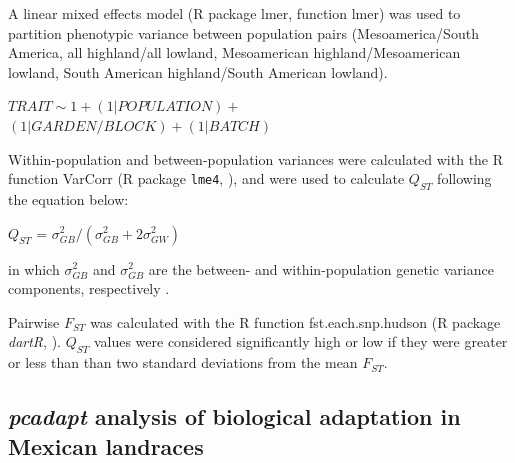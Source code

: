\documentclass[9pt,twocolumn,twoside,lineno]{BioRxiv}
\begin{document}
A linear mixed effects model (R package lmer, function lmer) was used to partition phenotypic variance between population pairs (Mesoamerica/South America, all highland/all lowland, Mesoamerican highland/Mesoamerican lowland, South American highland/South American lowland).

\begin{center}

${ TRAIT \sim 1 + (1|POPULATION) + }$\\
${(1|GARDEN/BLOCK) + (1|BATCH)}$

\end{center}

Within-population and between-population variances were calculated with the R function VarCorr (R package \texttt{lme4}, \citealp{bates2014lme4}), and were used to calculate $Q_{ST}$ following the equation below:

\begin{center}
$Q_{ST}$ = \(\sigma^{2}_{GB}/(\sigma^{2}_{GB}+2\sigma^{2}_{GW})\)
\end{center}

\noindent in which $\sigma^{2}_{GB}$ and $\sigma^{2}_{GB}$ are the between- and within-population genetic variance components, respectively \cite{Leinonen2013-ic}.

Pairwise $F_{ST}$ was calculated with the R function fst.each.snp.hudson (R package \textit{dartR}, \citealp{gruber2018dartr}).
$Q_{ST}$ values were considered significantly high or low if they were greater or less than than two standard deviations from the mean $F_{ST}$.
\subsection{\textit{pcadapt} analysis of biological adaptation in Mexican landraces}
\end{document}
